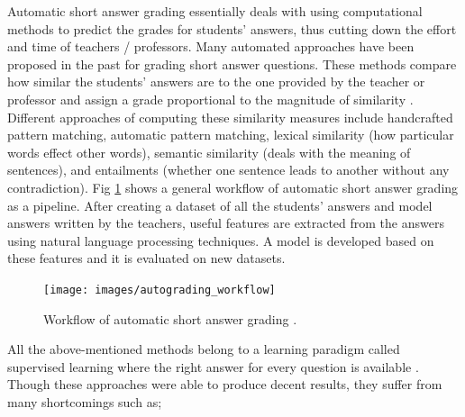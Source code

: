 \documentclass[rnd]{mas_proposal}
\begin{document}
Automatic short answer grading essentially deals with using computational methods to predict the grades for students' answers, thus cutting down the effort and time of teachers / professors. Many automated approaches have been proposed in the past for grading short answer questions. These methods compare how similar the students' answers are to the one provided by the teacher or professor and assign a grade proportional to the magnitude of similarity \cite{Mohler2011}. Different approaches of computing these similarity measures include handcrafted pattern matching, automatic pattern matching, lexical similarity (how particular words effect other words), semantic similarity (deals with the meaning of sentences), and entailments (whether one sentence leads to another without any contradiction). Fig \ref{auto_workflow} shows a general workflow of automatic short answer grading as a pipeline. After creating a dataset of all the students' answers and model answers written by the teachers, useful features are extracted from the answers using natural language processing techniques. A model is developed based on these features and it is evaluated on new datasets.

\vspace{3mm}

\begin{figure}[h!]
	\texttt{[image: images/autograding\_workflow]}
	\caption{Workflow of automatic short answer grading \cite{Burrows2015}.}
	\label{auto_workflow}
\end{figure}

All the above-mentioned methods belong to a learning paradigm called supervised learning where the right answer for every question is available \cite{Horbach2016}. Though these approaches were able to produce decent results, they suffer from many shortcomings such as;
\end{document}
